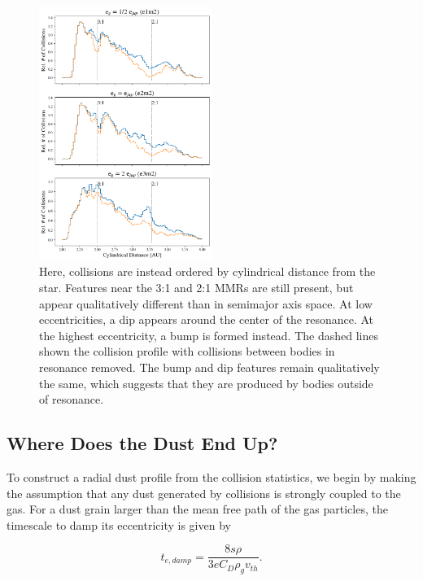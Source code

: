 \documentclass[twocolumn]{aastex63}
\begin{document}
\begin{figure}
\begin{center}
    \includegraphics[width=0.5\textwidth]{figures/coll_hist_r.png}
    \caption{Here, collisions are instead ordered by cylindrical distance from the star. Features near the 3:1 and 2:1 MMRs are still present, but appear qualitatively different than in semimajor axis space. At low eccentricities, a dip appears around the center of the resonance. At the highest eccentricity, a bump is formed instead. The dashed lines shown the collision profile with collisions between bodies in resonance removed. The bump and dip features remain qualitatively the same, which suggests that they are produced by bodies outside of resonance.\label{fig:coll_hist_r}}
\end{center}
\end{figure}

\subsection{Where Does the Dust End Up?}

To construct a radial dust profile from the collision statistics, we begin by making the assumption that any dust generated by collisions is strongly 
coupled to the gas. For a dust grain larger than the mean free path of the gas particles, the timescale to damp its eccentricity is given by 
\citep{1976PThPh..56.1756A}

\begin{equation}\label{eq:t_edamp}
    t_{e, damp} = \frac{8 s \rho}{3 e C_{D} \rho_{g} v_{th}}.
\end{equation}
\end{document}
